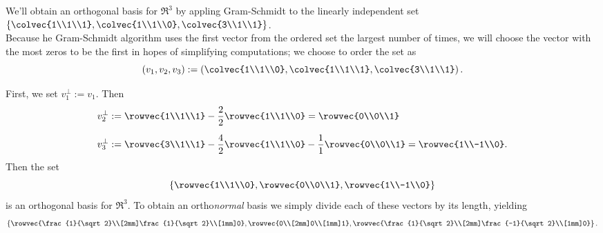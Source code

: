 \begin{example}
We'll  obtain an orthogonal basis for $\Re^3$ by appling Gram-Schmidt to the linearly independent set 
$\left\{\colvec{1\\1\\1}, \colvec{1\\1\\0},\colvec{3\\1\\1} \right\}$.\\

Because he Gram-Schmidt algorithm uses the first vector from the ordered set the largest number of times, we will choose the vector with the most zeros to be the first in hopes of simplifying computations; we choose to order the set as
\[( v_1,v_2,v_3)
:= \left( \colvec{1\\1\\0}, \colvec{1\\1\\1},\colvec{3\\1\\1} \right).\]

First, we set $v_1^\perp:=v_1$.  Then
\begin{align*}
v_2^\perp&:= \rowvec{1\\1\\1} - \frac{2}{2}\rowvec{1\\1\\0} = \rowvec{0\\0\\1} \\[2mm]
v_3^\perp&:= \rowvec{3\\1\\1} - \frac{4}{2}\rowvec{1\\1\\0} - \frac{1}{1}\rowvec{0\\0\\1} = \rowvec{1\\-1\\0}. 
\end{align*}
Then the set
\[
\left\{ \rowvec{1\\1\\0},\rowvec{0\\0\\1},\rowvec{1\\-1\\0}\right\}
\]
is an orthogonal basis for $\Re^3$.  To obtain an ortho{\itshape normal} basis we simply divide each of these vectors by its length, yielding
\[
\left\{ \rowvec{\frac{1}{\sqrt2}\\[2mm]\frac{1}{\sqrt2}\\[1mm]0},\rowvec{0\\[2mm]0\\[1mm]1},\rowvec{\frac{1}{\sqrt2}\\[2mm]\frac{-1}{\sqrt2}\\[1mm]0}\right\}.
\]
\end{example}

